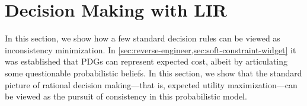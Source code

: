 

%



\section{Decision Making with LIR}

In this section, we show how a few standard decision rules can be viewed as inconsistency minimization. 
% 
In \cref{sec:reverse-engineer,sec:soft-constraint-widget} it was established that PDGs can represent expected cost,
albeit by articulating some questionable probabilistic beliefs. 
%
In this section, we show that the standard picture of rational decision making---that is, expected utility maximization---can be viewed as the pursuit of consistency in this probabilistic model. 

